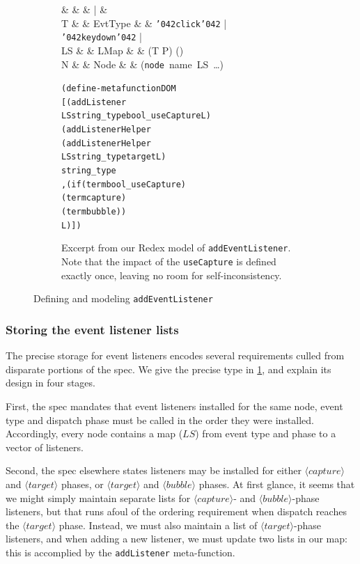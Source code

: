 \documentclass[letterpaper,10pt,twocolumn]{article}
\newcommand{\quot}{\mbox{\tt\char'042}}
\newcommand{\wild}{\mbox{\tt\char'137}}
\newcommand{\impl}[1]{{\def\_{\wild}\def\"{\quot}\tt#1}}
\newcommand{\kw}[1]{\ensuremath{\langle\mathit{#1}\rangle}}
\begin{document}
\begin{figure}
\begin{subfigure}{0.525\textwidth}
\begin{syntax}
  &    &       & \bnf| & \text{\impl{debug-print}}  \\
T & \in & EvtType & \ceqq & \impl{\"click\"} \bnf| \impl{\"keydown\"}
\bnf| \cdots \\
LS & \in & LMap & \ceqq & (T \times P) \rightharpoonup
() \\
N & \in & Node & \ceqq & (\impl{node}\ name\ LS\ \ldots)
\end{syntax}
\begin{alltt}
(define-metafunction DOM
  [(addListener 
      LS string_type bool_useCapture L)
   (addListenerHelper 
     (addListenerHelper
       LS string_type target L)
     string_type
     ,(if (term bool_useCapture) 
        (term capture) 
        (term bubble))
     L)])
\end{alltt}
    \caption{Excerpt from our Redex model of \impl{addEventListener}.
      Note that the impact of the \impl{useCapture} is defined exactly
      once, leaving no room for self-inconsistency.}
    \label{fig:aEL:model}
  \end{subfigure}
  \caption{Defining and modeling \impl{addEventListener}}
  \label{fig:aEL}
\end{figure}
\subsubsection{Storing the event listener lists} 
The precise storage for event listeners encodes several requirements
culled from disparate portions of the spec.  We give the precise type in
\cref{fig:aEL:model}, and explain its design in four stages.

First, the spec mandates that event listeners installed for the same node,
event type and dispatch phase must be called in the order they were
installed.  Accordingly, every node contains a map ($LS$) from event
type and phase to a vector of listeners.

Second, the spec elsewhere states listeners may be installed for
either \kw{capture} and \kw{target} phases, or \kw{target} and
\kw{bubble} phases.  At first glance, it seems that we might simply
maintain separate lists for \kw{capture}- and \kw{bubble}-phase
listeners, but that runs afoul of the ordering requirement when
dispatch reaches the \kw{target} phase.  Instead, we must also
maintain a list of \kw{target}-phase listeners, and when adding a new
listener, we must update two lists in our map: this is accomplied by
the \impl{addListener} meta-function.
\end{document}
